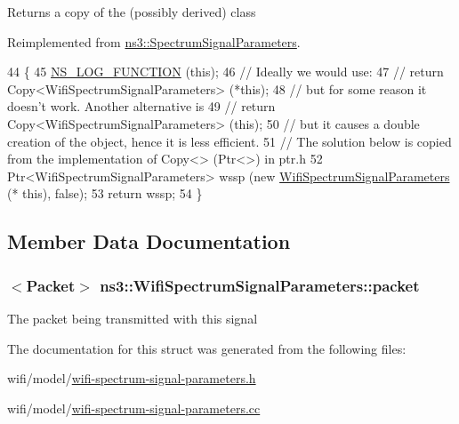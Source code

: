 \begin{DoxyReturn}{Returns}
a copy of the (possibly derived) class 
\end{DoxyReturn}


Reimplemented from \hyperlink{structns3_1_1SpectrumSignalParameters_a3404dea9df9e0fc4f47fa041bf68855c}{ns3\+::\+Spectrum\+Signal\+Parameters}.


\begin{DoxyCode}
44 \{
45   \hyperlink{log-macros-disabled_8h_a90b90d5bad1f39cb1b64923ea94c0761}{NS\_LOG\_FUNCTION} (\textcolor{keyword}{this});
46   \textcolor{comment}{// Ideally we would use:}
47   \textcolor{comment}{//   return Copy<WifiSpectrumSignalParameters> (*this);}
48   \textcolor{comment}{// but for some reason it doesn't work. Another alternative is}
49   \textcolor{comment}{//   return Copy<WifiSpectrumSignalParameters> (this);}
50   \textcolor{comment}{// but it causes a double creation of the object, hence it is less efficient.}
51   \textcolor{comment}{// The solution below is copied from the implementation of Copy<> (Ptr<>) in ptr.h}
52   Ptr<WifiSpectrumSignalParameters> wssp (\textcolor{keyword}{new} \hyperlink{structns3_1_1WifiSpectrumSignalParameters_a61e240bf21e87d284861aa5d85e91f3a}{WifiSpectrumSignalParameters} (*\textcolor{keyword}{
      this}), \textcolor{keyword}{false});
53   \textcolor{keywordflow}{return} wssp;
54 \}
\end{DoxyCode}


\subsection{Member Data Documentation}
\subsubsection[{\texorpdfstring{packet}{packet}}]{$<${\bf Packet}$>$ ns3\+::\+Wifi\+Spectrum\+Signal\+Parameters\+::packet}\hypertarget{structns3_1_1WifiSpectrumSignalParameters_a3302ca9118103a1f4f69b1c10dddb979}{}\label{structns3_1_1WifiSpectrumSignalParameters_a3302ca9118103a1f4f69b1c10dddb979}
The packet being transmitted with this signal 

The documentation for this struct was generated from the following files\+:\begin{DoxyCompactItemize}
\item 
wifi/model/\hyperlink{wifi-spectrum-signal-parameters_8h}{wifi-\/spectrum-\/signal-\/parameters.\+h}\item 
wifi/model/\hyperlink{wifi-spectrum-signal-parameters_8cc}{wifi-\/spectrum-\/signal-\/parameters.\+cc}\end{DoxyCompactItemize}

